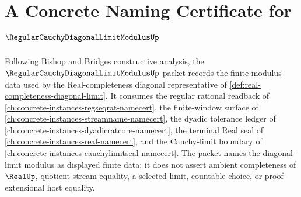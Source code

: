 \chapter{A Concrete Naming Certificate for $\RegularCauchyDiagonalLimitModulusUp$}
\label{ch:concrete-instances-regular-cauchy-diagonal-limit-modulus-namecert}

Following Bishop and Bridges constructive analysis, the $\RegularCauchyDiagonalLimitModulusUp$ packet records the finite modulus data used by the Real-completeness diagonal representative of \autoref{def:real-completeness-diagonal-limit}. It consumes the regular rational readback of \autoref{ch:concrete-instances-regseqrat-namecert}, the finite-window surface of \autoref{ch:concrete-instances-streamname-namecert}, the dyadic tolerance ledger of \autoref{ch:concrete-instances-dyadicratcore-namecert}, the terminal Real seal of \autoref{ch:concrete-instances-real-namecert}, and the Cauchy-limit boundary of \autoref{ch:concrete-instances-cauchylimitseal-namecert}. The packet names the diagonal-limit modulus as displayed finite data; it does not assert ambient completeness of $\RealUp$, quotient-stream equality, a selected limit, countable choice, or proof-extensional host equality.


